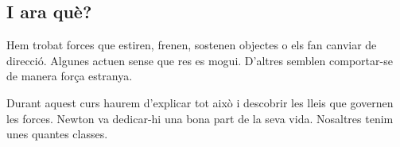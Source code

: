 \subsection{I ara què?}

Hem trobat forces que estiren, frenen, sostenen objectes o els fan canviar de direcció. Algunes actuen sense que res es mogui. D'altres semblen comportar-se de manera força estranya.

Durant aquest curs haurem d'explicar tot això i descobrir les lleis que governen les forces. Newton va dedicar-hi una bona part de la seva vida. Nosaltres tenim unes quantes classes. 
